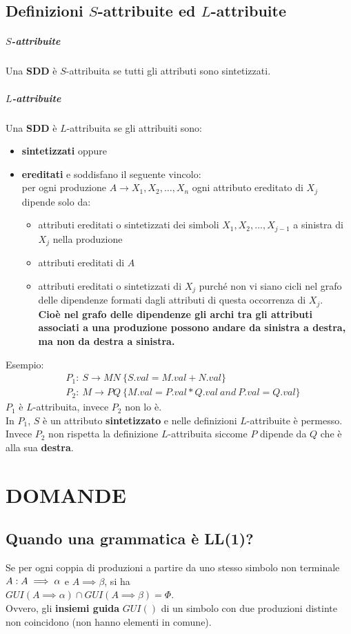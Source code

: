 \documentclass[12pt]{article}
\begin{document}
\subsection{Definizioni $S$-attribuite ed $L$-attribuite}
\subparagraph*{$S$-attribuite}
Una \textbf{SDD} è $S$-attribuita se tutti gli attributi sono sintetizzati.
\subparagraph*{$L$-attribuite}
Una \textbf{SDD} è $L$-attribuita se gli attribuiti sono:
\begin{itemize}
    \item \textbf{sintetizzati} oppure
    \item \textbf{ereditati} e soddisfano il seguente vincolo:\\
    per ogni produzione $A \rightarrow X_1, X_2, \dots, X_n$ ogni attributo ereditato di $X_j$ dipende solo da:
    \begin{itemize}
        \item attributi ereditati o sintetizzati dei simboli $X_1,X_2, \dots, X_{j-1}$ a sinistra di $X_j$ nella produzione
        \item attributi ereditati di $A$
        \item attributi ereditati o sintetizzati di $X_j$ purché non vi siano cicli nel grafo delle dipendenze formati dagli attributi di questa occorrenza di $X_j$.
        \\ \textbf{Cioè nel grafo delle dipendenze gli archi tra gli attributi associati a una produzione possono andare da sinistra a destra, ma non da destra a sinistra.}
    \end{itemize}
\end{itemize}
Esempio:
\begin{align*}
   &P_1:\ S \rightarrow MN\ \{S.val= M.val + N.val\}\\
   &P_2:\ M \rightarrow PQ\ \{M.val = P.val * Q.val\  and\ P.val =Q.val\} 
\end{align*}
$P_1$ è $L$-attribuita, invece $P_2$ non lo è.\\
In $P_1$, $S$ è un attributo \textbf{sintetizzato} e nelle definizioni 
$L$-attribuite è permesso.\\ 
Invece $P_2$ non rispetta la definizione $L$-attribuita  
siccome $P$ dipende da $Q$ che è alla sua \textbf{destra}.
\newpage


\section{DOMANDE}
\subsection{Quando una grammatica è LL(1)?}
Se per ogni coppia di produzioni a partire da uno stesso simbolo non terminale $A:\\
A\implies \alpha$ e $A \implies \beta$, si ha\\
$GUI(A \implies \alpha) \cap GUI(A \implies \beta) = \Phi$.\\
Ovvero, gli \textbf{insiemi guida} $GUI()$ di un simbolo con due produzioni distinte non coincidono (non hanno elementi in comune).
\end{document}
